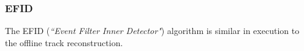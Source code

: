 \subsubsection*{EFID}
The EFID (\emph{``Event Filter Inner Detector"}) algorithm is similar in execution to the offline track reconstruction.









